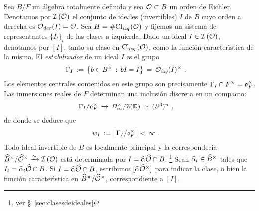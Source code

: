 % 
% 
Sea $B/F$ un \'{a}lgebra totalmente definida y sea $\cal{O}\subset B$ un orden
de Eichler. Denotamos por $\ideales{\cal{O}}$ el conjunto de ideales
(invertibles) $I$ de $B$ cuyo orden a derecha es $\Oder(I)=\cal{O}$. Sea
$H=\#\lClass{\cal{O}}$ y fijemos un sistema de representantes $\{I_{t}\}_{t}$
de las clases a izquierda. Dado un ideal $I\in\ideales{\cal{O}}$, denotamos por
$[I]$, tanto su clase en $\lClass{\cal{O}}$, como la funci\'{o}n
caracter\'{\i}stica de la misma. El \emph{estabilizador} de un ideal $I$ es el
grupo
\begin{align*}
	\Gamma_{I} & \,:=\,\big\{b\in B^{\times}\,:\,bI=I\big\} \,=\,
		\Oizq(I)^{\times}
	\text{ .}
\end{align*}
%
Los elementos centrales contenidos en este grupo son precisamente
$\Gamma_{I}\cap F^{\times}=\oka{F}^{\times}$. Las inmersiones reales de $F$
determinan una inclusi\'{o}n discreta en un compacto:
\begin{align*}
	& \Gamma_{I}/\oka{F}^{\times}\,\hookrightarrow\,
		\Idinf{B}/\centre(\bb{R})
		\,\simeq\,(S^{3})^{n}
	\text{ ,}
\end{align*}
%
de donde se deduce que
\begin{align*}
	w_{I} & \,:=\, \big|\Gamma_{I}/\oka{F}^{\times}\big|\,<\,\infty
	\text{ .}
\end{align*}
%
Todo ideal invertible de $B$ es localmente principal y la correspondecia
$\Idfin{B}/\Idfin{\cal{O}}\xrightarrow{\sim}\ideales{\cal{O}}$ est\'{a}
determinada por
$I=\hhat{\alpha}\Adfin{\cal{O}}\cap B$.%
\footnote{
	ver \S~\ref{sec:clasesdeideales}
}
Sean $\hhat{\alpha}_{t}\in\Idfin{B}$ tales que
$I_{t}=\hhat{\alpha}_{t}\Adfin{\cal{O}}\cap B$. Si
$I=\hhat{\alpha}\Adfin{\cal{O}}\cap B$, escribimos
$[\hhat{\alpha}\Idfin{\cal{O}}]$ para indicar la clase, o bien la funci\'{o}n
caracter\'{\i}stica en $\Idfin{B}/\Idfin{\cal{O}}$, correspondiente a $[I]$.

